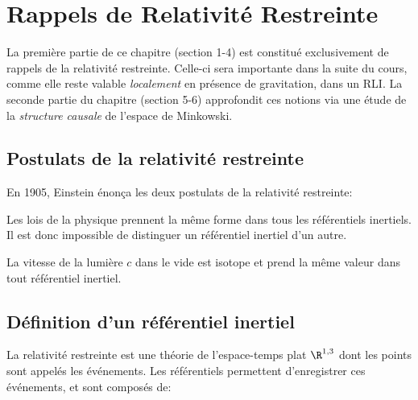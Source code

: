 \chapter{Rappels de Relativité Restreinte}
La première partie de ce chapitre (section 1-4) est constitué exclusivement de rappels de la relativité restreinte. Celle-ci sera importante dans la suite du cours, comme elle reste valable \emph{localement} en présence de gravitation, dans un RLI. La seconde partie du chapitre (section 5-6) approfondit ces notions via une étude de la \emph{structure causale} de l'espace de Minkowski.


\section{Postulats de la relativité restreinte}
En 1905, Einstein énonça les deux postulats de la relativité restreinte:
\begin{theoremframe}
    \begin{post}
        Les lois de la physique prennent la même forme dans tous les référentiels inertiels. Il est donc impossible de distinguer un référentiel inertiel d'un autre.
    \end{post}
\end{theoremframe}
\begin{theoremframe}
    \begin{post}
        La vitesse de la lumière $c$ dans le vide est isotope et prend la même valeur dans tout référentiel inertiel.
    \end{post}
\end{theoremframe}
\section{Définition d'un référentiel inertiel}

La relativité restreinte est une théorie de l'espace-temps plat $\R ^{1,3}$ dont les points sont appelés les événements. Les référentiels permettent d'enregistrer ces événements, et sont composés de:

